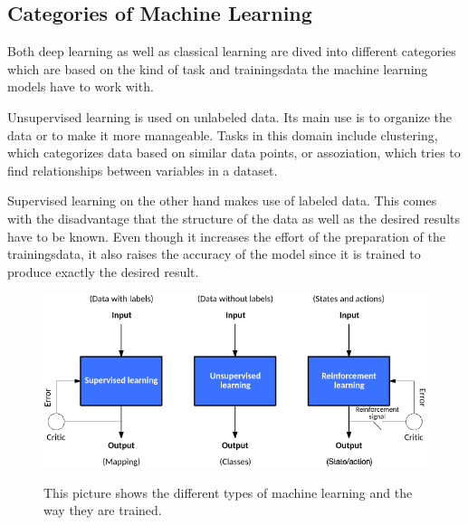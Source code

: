 
\subsection{Categories of Machine Learning}
Both deep learning as well as classical learning are dived into different categories which are based on the kind of task and trainingsdata the machine learning models have to work with.

Unsupervised learning is used on unlabeled data. Its main use is to organize the data or to make it more manageable. Tasks in this domain include clustering, which categorizes data based on similar data points, or assoziation, which tries to find relationships between variables in a dataset\cite{supervised-unsupervised-learning}.

Supervised learning on the other hand makes use of labeled data. This comes with the disadvantage that the structure of the data as well as the desired results have to be known\cite{classical-ml}. Even though it increases the effort of the preparation of the trainingsdata, it also raises the accuracy of the model since it is trained to produce exactly the desired result.


\begin{figure}[ht]
  \caption[Different kinds of machine learning]{This picture shows the different types of machine learning and the way they are trained\cite{types-of-ml}.} %
  \centering
  \includegraphics[width=\linewidth]{img/types_of_machine_learning.png}\label{fig:kinds_of_ml}
\end{figure}
